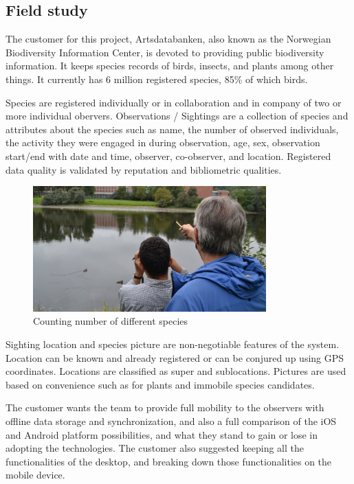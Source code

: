 \subsection{Field study}
\label{sec:field-study}

The customer for this project, Artsdatabanken, also known as the Norwegian Biodiversity Information Center, is devoted to providing public biodiversity information. It keeps species records of birds, insects, and plants among other things. It currently has 6 million registered species, 85\% of which birds\cite{arts:field-study}. \newline

Species are registered individually or in collaboration and in company of two or more individual obervers. Observations / Sightings are a collection of species and attributes about the species such as name, the number of observed individuals, the activity they were engaged in during observation, age, sex, observation start/end with date and time, observer, co-observer, and location. Registered data quality is validated by reputation and bibliometric qualities.

\begin{figure}[htb]
	\centering
	\includegraphics[width=0.8\textwidth]{prestudy/field_study/field_stud.jpg}
	\caption{Counting number of different species}
	\label{fig:field_study}
\end{figure}

Sighting location and species picture are non-negotiable features of the system. Location can be known and already registered or can be conjured up using GPS coordinates. Locations are classified as super and sublocations. Pictures are used based on convenience such as for plants and immobile species candidates.

The customer wants the team to provide full mobility to the observers with offline data storage and synchronization, and also a full comparison of the iOS and Android platform possibilities, and what they stand to gain or lose in adopting the technologies. The customer also suggested keeping all the functionalities of the desktop, and breaking down those functionalities on the mobile device.

